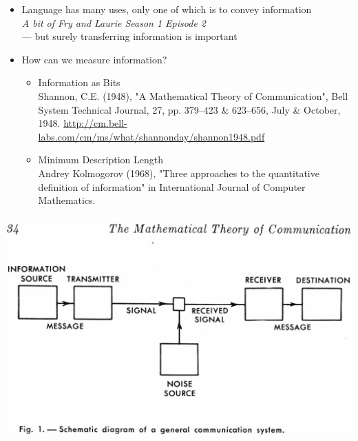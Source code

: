\documentclass[a4paper,landscape,headrule,footrule,xetex]{foils}
\begin{document}




\begin{itemize}
\item Language has many uses, only one of which is to convey information
  \\ \textit{A bit of Fry and Laurie Season 1 Episode 2}
  \\ --- but surely transferring information is important
\item How can we measure information?
  \begin{itemize}
  \item Information as Bits
\\ {\small Shannon, C.E. (1948), "A Mathematical Theory of Communication", Bell System Technical Journal, 27, pp. 379–423 \& 623–656, July \& October, 1948. \url{http://cm.bell-labs.com/cm/ms/what/shannonday/shannon1948.pdf}}
  \item Minimum Description Length
\\ {\small Andrey Kolmogorov (1968), "Three approaches to the quantitative definition of information" in International Journal of Computer Mathematics.}
  \end{itemize}
\end{itemize}

\begin{center}
  \includegraphics[height=0.9\textheight]{../pics/shannon_comm_channel}
\end{center}
\end{document}
